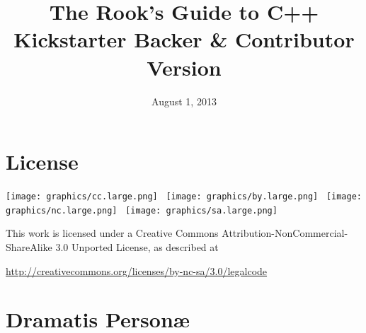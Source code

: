 \documentclass[11pt,final]{book}
\title{The Rook's Guide to C++
 \\ \small{Kickstarter Backer \& Contributor Version}
      }
\date{August 1, 2013}
\begin{document}
 \maketitle
 \thispagestyle{empty}
 \newpage

 \setcounter{page}{1}
 \tableofcontents





\chapter*{License}

\vspace{1in}

\texttt{[image: graphics/cc.large.png]} \
\texttt{[image: graphics/by.large.png]} \
\texttt{[image: graphics/nc.large.png]} \
\texttt{[image: graphics/sa.large.png]}

\vspace{1in}

\noindent This work is licensed under a Creative Commons Attribution-NonCommercial-ShareAlike 3.0 Unported License, as described at \newline

\noindent \footnotesize \url{http://creativecommons.org/licenses/by-nc-sa/3.0/legalcode}







   \chapter*{Dramatis Person\ae}
\end{document}
